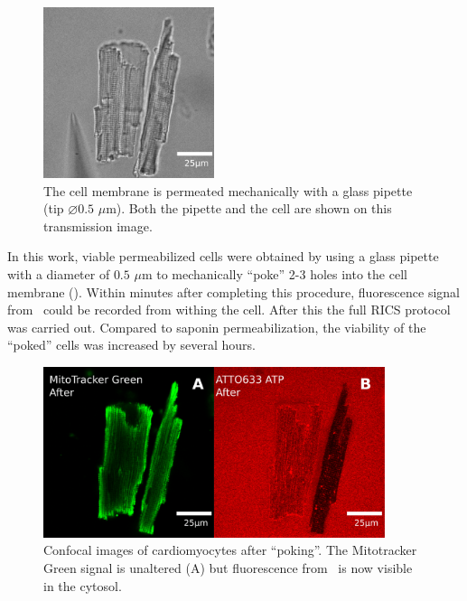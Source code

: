 \begin{figure}[t]
  \centering
    \includegraphics[width=5cm]{figures/cells2.pdf}
    \caption[Permeation of cardiomyocytes]{The cell membrane is permeated mechanically with a
    glass pipette (tip $\diameter 0.5$ $\mu$m). Both the pipette and the
    cell are shown on this transmission image.}
  \label{fig:cells_2}
\end{figure}

In this work, viable permeabilized cells were obtained by using a glass pipette with a diameter of $0.5$ $\mu$m to mechanically
``poke'' 2-3 holes into the cell membrane (\F{\ref{fig:cells_1}}).
Within minutes after completing this procedure, fluorescence signal from \ATP\
could be recorded from withing the cell. After this the full \ac{RICS}
protocol was carried out. Compared to saponin permeabilization, the
viability of the ``poked'' cells was increased by several hours.

\begin{figure}[t!]
  \centering
    \includegraphics[width=10cm]{figures/cells3.pdf}
    \caption[Permeated cardiomyocytes]{Confocal images of cardiomyocytes after ``poking''.
    The Mitotracker Green signal is unaltered (A) but fluorescence from \ATP\ is now
    visible in the cytosol.}
  \label{fig:cells_3}
\end{figure}
%
